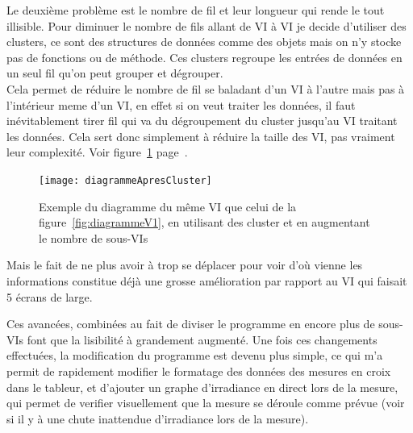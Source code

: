 \documentclass[12pt]{article}
\begin{document}
Le deuxième problème est le nombre de fil et leur longueur qui rende le tout illisible.
Pour diminuer le nombre de fils allant de VI à VI je decide d'utiliser des clusters, ce sont des structures de données comme des objets mais on n'y stocke pas de fonctions ou de méthode.
Ces clusters regroupe les entrées de données en un seul fil qu'on peut grouper et dégrouper.\\
Cela permet de réduire le nombre de fil se baladant d'un VI à l'autre mais pas à l'intérieur meme d'un VI, en effet si on veut traiter les données, il faut inévitablement tirer fil qui va du dégroupement du cluster jusqu'au VI traitant les données.
Cela sert donc simplement à réduire la taille des VI, pas vraiment leur complexité.
Voir figure~\ref{fig:diagApresCluster} page~\pageref{fig:diagApresCluster}.
\begin{figure}[h]
	\centering
	\texttt{[image: diagrammeApresCluster]}
	\caption{Exemple du diagramme du même VI que celui de la figure~\ref{fig:diagrammeV1}, en utilisant des cluster et en augmentant le nombre de sous-VIs}
	\label{fig:diagApresCluster}
\end{figure}
Mais le fait de ne plus avoir à trop se déplacer pour voir d'où vienne les informations constitue déjà une grosse amélioration par rapport au VI qui faisait 5 écrans de large.


Ces avancées, combinées au fait de diviser le programme en encore plus de sous-VIs font que la lisibilité à grandement augmenté.
Une fois ces changements effectuées, la modification du programme est devenu plus simple, ce qui m'a permit de rapidement modifier le formatage des données des mesures en croix dans le tableur, et d'ajouter un graphe d'irradiance en direct lors de la mesure, qui permet de verifier visuellement que la mesure se déroule comme prévue (voir si il y à une chute inattendue d'irradiance lors de la mesure).
\end{document}
